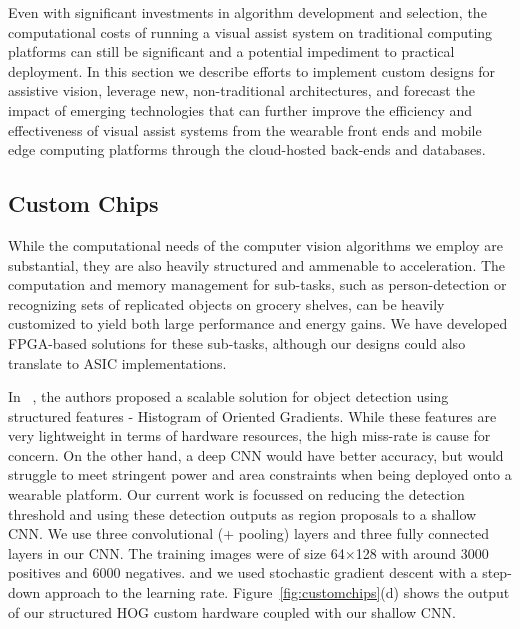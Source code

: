 Even with significant investments in algorithm development and
selection, the computational costs of running a visual assist system
on traditional computing platforms can still be significant and a
potential impediment to practical deployment. In this section we
describe efforts to implement custom designs for assistive vision,
leverage new, non-traditional architectures, and forecast the impact
of emerging technologies that can further improve the efficiency and
effectiveness of visual assist systems from the wearable front ends
and mobile edge computing platforms through the cloud-hosted back-ends
and databases.

\subsection{Custom Chips}
While the computational needs of the computer vision algorithms we
employ are substantial, they are also heavily structured and ammenable
to acceleration. The computation and memory management for sub-tasks,
such as person-detection or recognizing sets of replicated objects on
grocery shelves, can be heavily customized to yield both large
performance and energy gains. We have developed FPGA-based solutions
for these sub-tasks, although our designs could also translate to ASIC
implementations.

In ~\cite{fpl2015}, the authors proposed a scalable solution for object 
detection using structured features - Histogram of Oriented Gradients.
While these features are very lightweight in terms of hardware resources, 
the high miss-rate is cause for concern. On the other hand, a deep CNN 
would have better accuracy, but would struggle to meet stringent power 
and area constraints when being deployed onto a wearable platform. Our 
current work is focussed on reducing the detection threshold and using 
these detection outputs as region proposals to a shallow CNN. 
We use three convolutional (+ pooling) layers and three fully connected layers in our CNN. 
The training images were of size 64$\times$128 with around 3000 positives and 6000 negatives.
and we used stochastic gradient descent with a step-down approach to the learning rate. 
Figure~\ref{fig:customchips}(d) shows the output of our structured HOG
custom hardware coupled with our shallow CNN.

